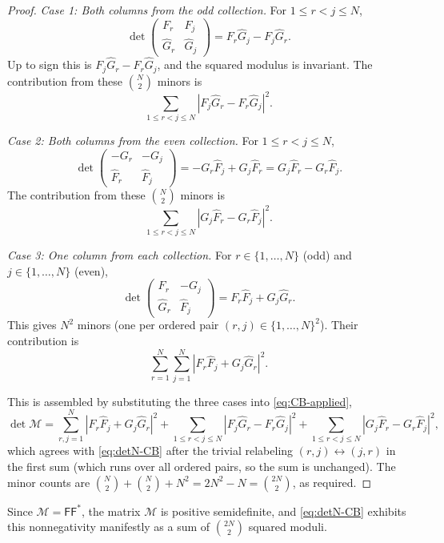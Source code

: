 \documentclass[11pt]{amsart}
\begin{document}
\begin{proof}
\smallskip

\textit{Case 1: Both columns from the odd collection.} For $1 \le r < j \le N$,
\[
\det \begin{pmatrix} F_r & F_j  \\ \hat G_r & \hat G_j \end{pmatrix}
= F_r \hat G_j - F_j \hat G_r.
\]
Up to sign this is $F_j \hat G_r - F_r \hat G_j$, and the squared modulus is invariant. The contribution from these $\binom{N}{2}$ minors is
\[
\sum_{1 \le r < j \le N} |F_j \hat G_r - F_r \hat G_j|^2.
\]

\smallskip

\textit{Case 2: Both columns from the even collection.} For $1 \le r < j \le N$,
\[
\det \begin{pmatrix} -G_r & -G_j \\ \hat F_r  & \hat F_j \end{pmatrix}
= -G_r \hat F_j + G_j \hat F_r = G_j \hat F_r - G_r \hat F_j.
\]
The contribution from these $\binom{N}{2}$ minors is
\[
\sum_{1 \le r < j \le N} |G_j \hat F_r - G_r \hat F_j|^2.
\]

\smallskip

\textit{Case 3: One column from each collection.} For $r \in \{1,\ldots,N\}$ (odd) and $j \in \{1,\ldots,N\}$ (even),
\[
\det \begin{pmatrix} F_r & -G_j \\ \hat G_r & \hat F_j \end{pmatrix}
= F_r \hat F_j + G_j \hat G_r.
\]
This gives $N^2$ minors (one per ordered pair $(r,j) \in \{1,\ldots,N\}^2$). Their contribution is
\[
\sum_{r=1}^{N}\sum_{j=1}^{N} |F_r \hat F_j + G_j \hat G_r|^2.
\]

\bigskip

This is assembled by substituting the three cases into \eqref{eq:CB-applied},
\[
\det\mathcal{M}
= \sum_{r,j=1}^{N} |F_r \hat F_j + G_j \hat G_r|^2
+ \sum_{1\leq r<j\leq N} |F_j \hat G_r - F_r \hat G_j|^2
+ \sum_{1\leq r<j\leq N} |G_j \hat F_r - G_r \hat F_j|^2,
\]
which agrees with \eqref{eq:detN-CB} after the trivial relabeling $(r,j) \leftrightarrow (j,r)$ in the first sum (which runs over all ordered pairs, so the sum is unchanged).  The minor counts are $\binom{N}{2} + \binom{N}{2} + N^2 = 2N^2 - N = \binom{2N}{2}$, as required.
\end{proof}

\begin{rem}\label{rmk:CB-PSD}
Since $\mathcal{M} = \mathsf{F} \mathsf{F}^*$, the matrix $\mathcal{M}$ is positive semidefinite, and \eqref{eq:detN-CB} exhibits this nonnegativity manifestly as a sum of $\binom{2N}{2}$ squared moduli. %
\end{rem}
\end{document}
